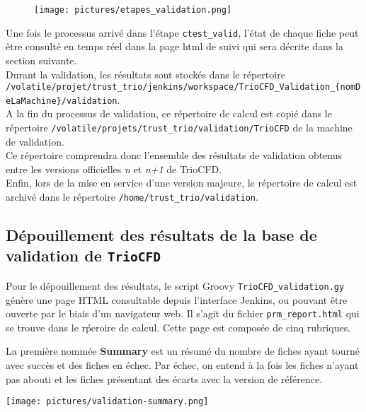 \begin{figure}[H]
   \centering
   \texttt{[image: pictures/etapes\_validation.png]}
   \vspace*{0.2cm}
\end{figure}

Une fois le processus arrivé dans l'étape \texttt{ctest\_valid},
l'état de chaque fiche peut être consulté en temps réel dans la page html de suivi qui sera décrite dans la section suivante.\\

Durant la validation, les résultats sont stockés
dans le répertoire \texttt{/volatile/projet/trust\_trio/jenkins/workspace/TrioCFD\_Validation\_\{nomDeLaMachine\}/validation}.\\

A la fin du processus de validation, ce r\'epertoire de calcul est copi\'e
dans le r\'epertoire \texttt{/volatile/projets/trust\_trio/validation/TrioCFD} de la machine de validation.\\
Ce r\'epertoire comprendra donc l'ensemble des r\'esultats de validation obtenus
entre les versions officielles \emph{n} et \emph{n+1} de TrioCFD.\\

Enfin, lors de la mise en service d'une version majeure,
le r\'epertoire de calcul est archiv\'e dans le r\'epertoire  \texttt{/home/trust\_trio/validation}.


\subsection{Dépouillement des résultats de la base de validation de \texttt{TrioCFD}}

Pour le dépouillement des résultats, le script Groovy \texttt{TrioCFD\_validation.gy}
génère une page HTML consultable depuis l'interface Jenkins, ou pouvant être ouverte
par le biais d'un navigateur web.
Il s'agit du fichier \texttt{prm\_report.html} qui se trouve dans le r\'peroire de calcul.
Cette page est composée de cinq rubriques.\smallskip\\

\begin{minipage}[c]{0.65\linewidth}
La première nommée \textbf{Summary} est un résumé du nombre de fiches ayant tourné avec succès et des fiches en échec.
Par échec, on entend à la fois les fiches n'ayant pas abouti et les fiches présentant des écarts avec la version de référence.
\end{minipage} \hfill
\begin{minipage}[c]{0.3\linewidth}
   \texttt{[image: pictures/validation-summary.png]}\vspace*{0.2cm}
\end{minipage}
\vspace{0.5cm}

